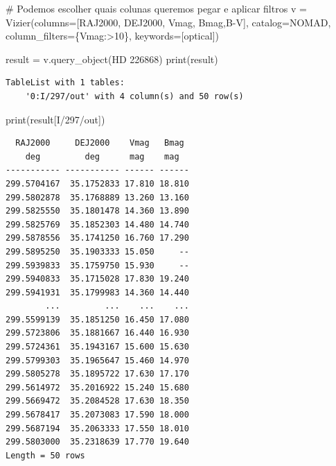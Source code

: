 \documentclass[
  letterpaper,
  DIV=11,
  numbers=noendperiod]{scrreprt}
\newenvironment{Shaded}{\begin{snugshade}}{\end{snugshade}}
\newcommand{\BuiltInTok}[1]{\textcolor[rgb]{0.00,0.23,0.31}{#1}}
\newcommand{\CommentTok}[1]{\textcolor[rgb]{0.37,0.37,0.37}{#1}}
\newcommand{\NormalTok}[1]{\textcolor[rgb]{0.00,0.23,0.31}{#1}}
\newcommand{\OperatorTok}[1]{\textcolor[rgb]{0.37,0.37,0.37}{#1}}
\newcommand{\StringTok}[1]{\textcolor[rgb]{0.13,0.47,0.30}{#1}}
\begin{document}
\begin{Shaded}
\begin{Highlighting}[]
\CommentTok{\# Podemos escolher quais colunas queremos pegar e aplicar filtros}
\NormalTok{v }\OperatorTok{=}\NormalTok{ Vizier(columns}\OperatorTok{=}\NormalTok{[}\StringTok{\textquotesingle{}RAJ2000\textquotesingle{}}\NormalTok{, }\StringTok{\textquotesingle{}DEJ2000\textquotesingle{}}\NormalTok{, }\StringTok{\textquotesingle{}Vmag\textquotesingle{}}\NormalTok{, }\StringTok{\textquotesingle{}Bmag\textquotesingle{}}\NormalTok{,}\StringTok{\textquotesingle{}B{-}V\textquotesingle{}}\NormalTok{], catalog}\OperatorTok{=}\StringTok{\textquotesingle{}NOMAD\textquotesingle{}}\NormalTok{,}
\NormalTok{           column\_filters}\OperatorTok{=}\NormalTok{\{}\StringTok{\textquotesingle{}Vmag\textquotesingle{}}\NormalTok{:}\StringTok{\textquotesingle{}\textgreater{}10\textquotesingle{}}\NormalTok{\}, keywords}\OperatorTok{=}\NormalTok{[}\StringTok{\textquotesingle{}optical\textquotesingle{}}\NormalTok{])}
\end{Highlighting}
\end{Shaded}

\begin{Shaded}
\begin{Highlighting}[]
\NormalTok{result }\OperatorTok{=}\NormalTok{ v.query\_object(}\StringTok{\textquotesingle{}HD 226868\textquotesingle{}}\NormalTok{)}
\BuiltInTok{print}\NormalTok{(result)}
\end{Highlighting}
\end{Shaded}

\begin{verbatim}
TableList with 1 tables:
    '0:I/297/out' with 4 column(s) and 50 row(s) 
\end{verbatim}

\begin{Shaded}
\begin{Highlighting}[]
\BuiltInTok{print}\NormalTok{(result[}\StringTok{\textquotesingle{}I/297/out\textquotesingle{}}\NormalTok{])}
\end{Highlighting}
\end{Shaded}

\begin{verbatim}
  RAJ2000     DEJ2000    Vmag   Bmag 
    deg         deg      mag    mag  
----------- ----------- ------ ------
299.5704167  35.1752833 17.810 18.810
299.5802878  35.1768889 13.260 13.160
299.5825550  35.1801478 14.360 13.890
299.5825769  35.1852303 14.480 14.740
299.5878556  35.1741250 16.760 17.290
299.5895250  35.1903333 15.050     --
299.5939833  35.1759750 15.930     --
299.5940833  35.1715028 17.830 19.240
299.5941931  35.1799983 14.360 14.440
        ...         ...    ...    ...
299.5599139  35.1851250 16.450 17.080
299.5723806  35.1881667 16.440 16.930
299.5724361  35.1943167 15.600 15.630
299.5799303  35.1965647 15.460 14.970
299.5805278  35.1895722 17.630 17.170
299.5614972  35.2016922 15.240 15.680
299.5669472  35.2084528 17.630 18.350
299.5678417  35.2073083 17.590 18.000
299.5687194  35.2063333 17.550 18.010
299.5803000  35.2318639 17.770 19.640
Length = 50 rows
\end{verbatim}
\end{document}
